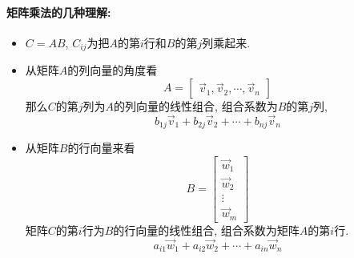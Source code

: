 \paragraph{矩阵乘法的几种理解:}
\begin{itemize}
    \item $C=AB$, $C_{ij}$为把$A$的第$i$行和$B$的第$j$列乘起来.
    
    \item 从矩阵$A$的列向量的角度看
    \begin{equation}
        A=\begin{bmatrix} \vec{v}_1, \vec{v}_2, \cdots, \vec{v}_n \end{bmatrix}
    \end{equation}
    那么$C$的第$j$列为$A$的列向量的线性组合, 组合系数为$B$的第$j$列,
    \begin{equation}
      b_{1j}\vec{v}_1 + b_{2j}\vec{v}_2+ \cdots + b_{nj}\vec{v}_n
    \end{equation}

    \item 从矩阵$B$的行向量来看
    \begin{equation}
      B = \begin{bmatrix} \vec{w}_1 \\ \vec{w}_2 \\ \vdots \\ \vec{w}_m \end{bmatrix}
    \end{equation}
    矩阵$C$的第$i$行为$B$的行向量的线性组合, 组合系数为矩阵$A$的第$i$行.
    \begin{equation}
      a_{i1}\vec{w}_1 + a_{i 2}\vec{w}_2 + \cdots +a_{in}\vec{w}_n
    \end{equation}
\end{itemize}


